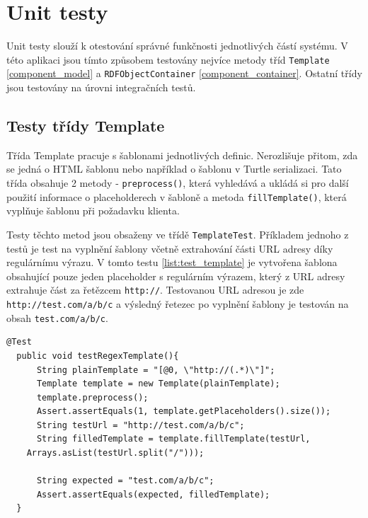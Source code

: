 \documentclass[thesis=B,czech]{FITthesis}[2012/06/26]
\begin{document}
  \section{Unit testy}
  Unit testy slouží k otestování správné funkčnosti jednotlivých částí systému. 
  V této aplikaci jsou tímto způsobem testovány nejvíce metody tříd \texttt{Template} \ref{component_model} a \texttt{RDFObjectContainer} \ref{component_container}.
  Ostatní třídy jsou testovány na úrovni integračních testů.
  
  \subsection{Testy třídy Template}
  Třída Template pracuje s šablonami jednotlivých definic. Nerozlišuje přitom, zda se jedná o HTML šablonu nebo například o šablonu v Turtle serializaci.
  Tato třída obsahuje 2 metody - \texttt{preprocess()}, která vyhledává a ukládá si pro další použití informace o placeholderech v šabloně a metoda
  \texttt{fillTemplate()}, která vyplňuje šablonu při požadavku klienta.
  
  Testy těchto metod jsou obsaženy ve třídě \texttt{TemplateTest}. Příkladem jednoho z testů je test na vyplnění šablony včetně extrahování
  části URL adresy díky regulárnímu výrazu.
  V tomto testu \ref{list:test_template} je vytvořena šablona obsahující pouze jeden placeholder s regulárním výrazem, který z 
  URL adresy extrahuje část za řetězcem \texttt{http://}.
  Testovanou URL adresou je zde \texttt{http://test.com/a/b/c} a výsledný řetezec po vyplnění šablony je testován na obsah \texttt{test.com/a/b/c}.
  
  \begin{lstlisting}[float=htb,caption={Unit test na vyplnění placeholderu v šabloně s regulárním výrazem},label=list:test_template]
  @Test
  public void testRegexTemplate(){
      String plainTemplate = "[@0, \"http://(.*)\"]";
      Template template = new Template(plainTemplate);
      template.preprocess();
      Assert.assertEquals(1, template.getPlaceholders().size());
      String testUrl = "http://test.com/a/b/c";
      String filledTemplate = template.fillTemplate(testUrl,
	Arrays.asList(testUrl.split("/")));

      String expected = "test.com/a/b/c";
      Assert.assertEquals(expected, filledTemplate);
  }
\end{lstlisting}
  
\end{document}
